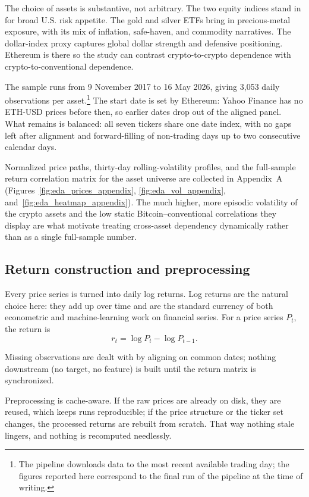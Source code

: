 The choice of assets is substantive, not arbitrary. The two equity indices stand in for broad U.S. risk appetite. The gold and silver ETFs bring in precious-metal exposure, with its mix of inflation, safe-haven, and commodity narratives. The dollar-index proxy captures global dollar strength and defensive positioning. Ethereum is there so the study can contrast crypto-to-crypto dependence with crypto-to-conventional dependence.

The sample runs from 9 November 2017 to 16 May 2026, giving 3{,}053 daily observations per asset.\footnote{The pipeline downloads data to the most recent available trading day; the figures reported here correspond to the final run of the pipeline at the time of writing.} The start date is set by Ethereum: Yahoo Finance has no ETH-USD prices before then, so earlier dates drop out of the aligned panel. What remains is balanced: all seven tickers share one date index, with no gaps left after alignment and forward-filling of non-trading days up to two consecutive calendar days.

Normalized price paths, thirty-day rolling-volatility profiles, and the full-sample
return correlation matrix for the asset universe are collected in Appendix~A
(Figures~\ref{fig:eda_prices_appendix}, \ref{fig:eda_vol_appendix},
and~\ref{fig:eda_heatmap_appendix}). The much higher, more episodic volatility of the
crypto assets and the low static Bitcoin--conventional correlations they display are
what motivate treating cross-asset dependency dynamically rather than as a single
full-sample number.

\subsection{Return construction and preprocessing}

Every price series is turned into daily log returns. Log returns are the natural choice here: they add up over time and are the standard currency of both econometric and machine-learning work on financial series. For a price series $P_t$, the return is
\[
    r_t = \log P_t - \log P_{t-1}.
\]

Missing observations are dealt with by aligning on common dates; nothing downstream (no target, no feature) is built until the return matrix is synchronized.

Preprocessing is cache-aware. If the raw prices are already on disk, they are reused, which keeps runs reproducible; if the price structure or the ticker set changes, the processed returns are rebuilt from scratch. That way nothing stale lingers, and nothing is recomputed needlessly.

